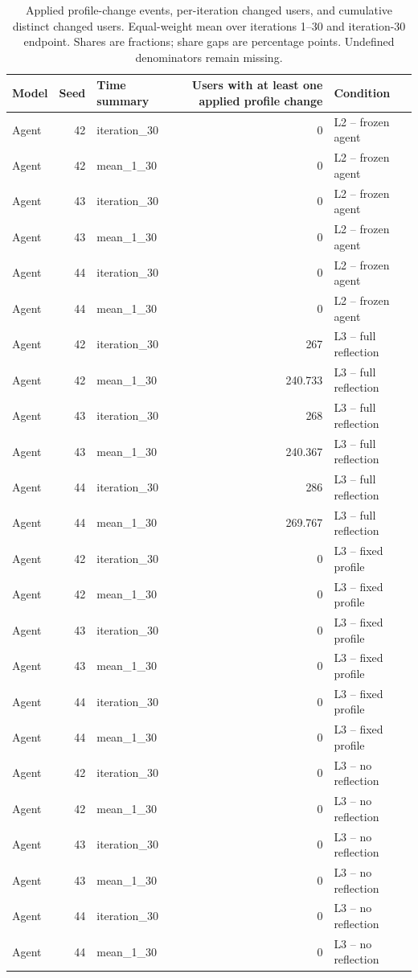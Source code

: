 \begin{table}[htbp!]
\centering
\small
\setlength{\tabcolsep}{3pt}
\renewcommand{\arraystretch}{1.1}
\begin{tabular}{lrlrl}
\hline
Model & Seed & Time summary & Users with at least one applied profile change & Condition \\
\hline
Agent & 42 & iteration\_30 & 0 & L2 -- frozen agent \\
Agent & 42 & mean\_1\_30 & 0 & L2 -- frozen agent \\
Agent & 43 & iteration\_30 & 0 & L2 -- frozen agent \\
Agent & 43 & mean\_1\_30 & 0 & L2 -- frozen agent \\
Agent & 44 & iteration\_30 & 0 & L2 -- frozen agent \\
Agent & 44 & mean\_1\_30 & 0 & L2 -- frozen agent \\
Agent & 42 & iteration\_30 & 267 & L3 -- full reflection \\
Agent & 42 & mean\_1\_30 & 240.733 & L3 -- full reflection \\
Agent & 43 & iteration\_30 & 268 & L3 -- full reflection \\
Agent & 43 & mean\_1\_30 & 240.367 & L3 -- full reflection \\
Agent & 44 & iteration\_30 & 286 & L3 -- full reflection \\
Agent & 44 & mean\_1\_30 & 269.767 & L3 -- full reflection \\
Agent & 42 & iteration\_30 & 0 & L3 -- fixed profile \\
Agent & 42 & mean\_1\_30 & 0 & L3 -- fixed profile \\
Agent & 43 & iteration\_30 & 0 & L3 -- fixed profile \\
Agent & 43 & mean\_1\_30 & 0 & L3 -- fixed profile \\
Agent & 44 & iteration\_30 & 0 & L3 -- fixed profile \\
Agent & 44 & mean\_1\_30 & 0 & L3 -- fixed profile \\
Agent & 42 & iteration\_30 & 0 & L3 -- no reflection \\
Agent & 42 & mean\_1\_30 & 0 & L3 -- no reflection \\
Agent & 43 & iteration\_30 & 0 & L3 -- no reflection \\
Agent & 43 & mean\_1\_30 & 0 & L3 -- no reflection \\
Agent & 44 & iteration\_30 & 0 & L3 -- no reflection \\
Agent & 44 & mean\_1\_30 & 0 & L3 -- no reflection \\
\hline
\end{tabular}
\caption{Applied profile-change events, per-iteration changed users, and cumulative distinct changed users. Equal-weight mean over iterations 1--30 and iteration-30 endpoint. Shares are fractions; share gaps are percentage points. Undefined denominators remain missing.}
\label{chap:results:tab:rq3_agents_distinct_changed_users}
\end{table}
